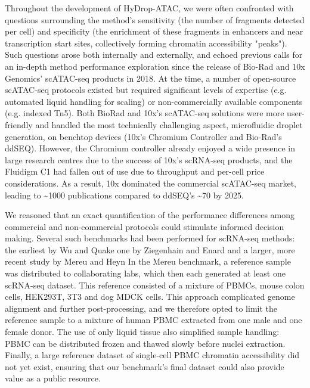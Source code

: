Throughout the development of HyDrop-ATAC, we were often confronted with questions surrounding the method's sensitivity (the number of fragments detected per cell) and specificity (the enrichment of these fragments in enhancers and near transcription start sites, collectively forming chromatin accessibility "peaks"). Such questions arose both internally and externally, and echoed previous calls for an in-depth method performance exploration since the release of Bio-Rad and 10x Genomics' scATAC-seq products in 2018. At the time, a number of open-source scATAC-seq protocols existed but required significant levels of expertise (e.g. automated liquid handling for scaling) or non-commercially available components (e.g. indexed Tn5). Both BioRad and 10x's scATAC-seq solutions were more user-friendly and handled the most technically challenging aspect, microfluidic droplet generation, on benchtop devices (10x's Chromium Controller and Bio-Rad's ddSEQ). However, the Chromium controller already enjoyed a wide presence in large research centres due to the success of 10x's scRNA-seq products, and the Fluidigm C1 had fallen out of use due to throughput and per-cell price considerations. As a result, 10x dominated the commercial scATAC-seq market, leading to \textasciitilde{1000} publications compared to ddSEQ's \textasciitilde{70} by 2025.

We reasoned that an exact quantification of the performance differences among commercial and non-commercial protocols could stimulate informed decision making. Several such benchmarks had been performed for scRNA-seq methods: the earliest by Wu and Quake one by Ziegenhain and Enard and a larger, more recent study by Mereu and Heyn In the Mereu benchmark, a reference sample was distributed to collaborating labs, which then each generated at least one scRNA-seq dataset. This reference consisted of a mixture of PBMCs, mouse colon cells, HEK293T, 3T3 and dog MDCK cells. This approach complicated genome alignment and further post-processing, and we therefore opted to limit the reference sample to a mixture of human PBMC extracted from one male and one female donor. The use of only liquid tissue also simplified sample handling: PBMC can be distributed frozen and thawed slowly before nuclei extraction. Finally, a large reference dataset of single-cell PBMC chromatin accessibility did not yet exist, ensuring that our benchmark's final dataset could also provide value as a public resource.
